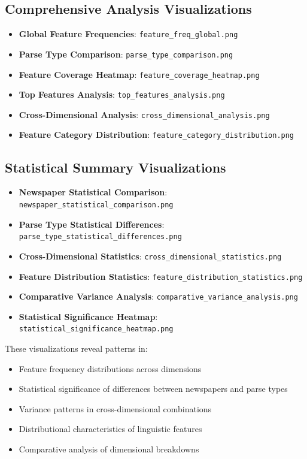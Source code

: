 \documentclass[11pt,a4paper]{article}
\begin{document}
\subsection{Comprehensive Analysis Visualizations}
\begin{itemize}
\item \textbf{Global Feature Frequencies}: \texttt{feature\_freq\_global.png}
\item \textbf{Parse Type Comparison}: \texttt{parse\_type\_comparison.png}
\item \textbf{Feature Coverage Heatmap}: \texttt{feature\_coverage\_heatmap.png}
\item \textbf{Top Features Analysis}: \texttt{top\_features\_analysis.png}
\item \textbf{Cross-Dimensional Analysis}: \texttt{cross\_dimensional\_analysis.png}
\item \textbf{Feature Category Distribution}: \texttt{feature\_category\_distribution.png}
\end{itemize}

\subsection{Statistical Summary Visualizations}
\begin{itemize}
\item \textbf{Newspaper Statistical Comparison}: \texttt{newspaper\_statistical\_comparison.png}
\item \textbf{Parse Type Statistical Differences}: \texttt{parse\_type\_statistical\_differences.png}
\item \textbf{Cross-Dimensional Statistics}: \texttt{cross\_dimensional\_statistics.png}
\item \textbf{Feature Distribution Statistics}: \texttt{feature\_distribution\_statistics.png}
\item \textbf{Comparative Variance Analysis}: \texttt{comparative\_variance\_analysis.png}
\item \textbf{Statistical Significance Heatmap}: \texttt{statistical\_significance\_heatmap.png}
\end{itemize}

These visualizations reveal patterns in:
\begin{itemize}
\item Feature frequency distributions across dimensions
\item Statistical significance of differences between newspapers and parse types
\item Variance patterns in cross-dimensional combinations
\item Distributional characteristics of linguistic features
\item Comparative analysis of dimensional breakdowns
\end{itemize}
\end{document}
